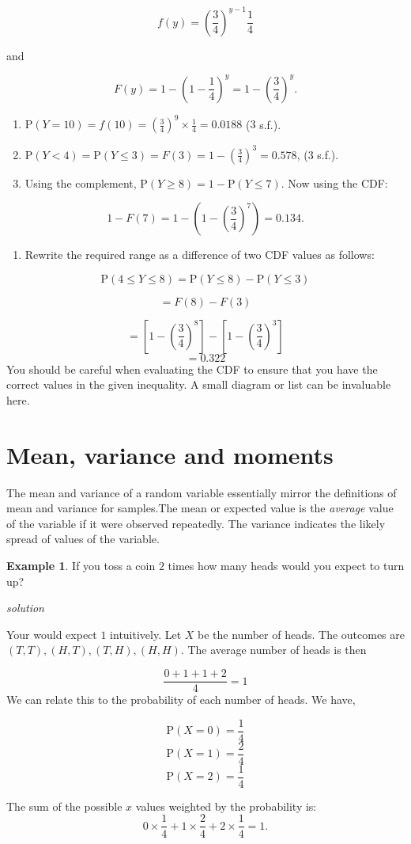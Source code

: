 \documentclass[
]{book}
\providecommand{\tightlist}{%
  \setlength{\itemsep}{0pt}\setlength{\parskip}{0pt}}
\theoremstyle{definition}
\theoremstyle{definition}
\newtheorem{example}{Example}[chapter]
\theoremstyle{definition}
\theoremstyle{definition}
\theoremstyle{remark}
\begin{document}
\[f(y) = \left( \frac{3}{4} \right) ^{y-1}\frac{1}{4}\]

and

\[ F(y) = 1- \left(1-\frac{1}{4}\right)^y = 1-\left( \frac{3}{4}\right)^y.\]

\begin{enumerate}
\def\labelenumi{\arabic{enumi}.}
\item
  \(\text{P}(Y=10) = f(10) = \left( \frac{3}{4}\right)^9\times \frac{1}{4} = 0.0188\) (\(3\) s.f.).
\item
  \(\text{P}(Y<4) = \text{P}(Y\leq 3) = F(3) =1 - \left( \frac{3}{4}\right)^3 = 0.578\), (\(3\) s.f.).
\item
  Using the complement, \(\text{P}(Y\geq 8) = 1 - \text{P}(Y\leq 7)\). Now using the CDF:
\end{enumerate}

\[1-F(7) = 1- \left( 1-\left(\frac{3}{4}\right)^7\right) = 0.134.\]

\begin{enumerate}
\def\labelenumi{\arabic{enumi}.}
\setcounter{enumi}{3}
\tightlist
\item
  Rewrite the required range as a difference of two CDF values as follows:
\end{enumerate}

\[\text{P}(4\leq Y\leq 8) = \text{P}(Y\leq 8) - \text{P}(Y\leq 3)\]

\[ = F(8) - F(3)\]

\[ = \left[ 1-\left(\frac{3}{4}\right)^8\right] -  \left[ 1-\left(\frac{3}{4}\right)^3\right]\]
\[ = 0.322\]
You should be careful when evaluating the CDF to ensure that you have the correct values in the given inequality. A small diagram or list can be invaluable here.

\hypertarget{mean-variance-and-moments}{%
\section{Mean, variance and moments}\label{mean-variance-and-moments}}

The mean and variance of a random variable essentially mirror the definitions of mean and variance for samples.The mean or expected value is the \emph{average} value of the variable if it were observed repeatedly. The variance indicates the likely spread of values of the variable.

\begin{example}
If you toss a coin \(2\) times how many heads would you expect to turn up?

\emph{solution}

Your would expect \(1\) intuitively. Let \(X\) be the number of heads.
The outcomes are \((T,T),(H,T),(T,H),(H,H)\). The average number of heads is then

\[ \frac{0+1+1+2}{4} = 1\]
We can relate this to the probability of each number of heads. We have,

\[\text{P}(X=0) = \frac{1}{4}\]
\[\text{P}(X=1) = \frac{2}{4}\]
\[\text{P}(X=2) = \frac{1}{4}\]

The sum of the possible \(x\) values weighted by the probability is:
\[0\times \frac{1}{4} + 1\times \frac{2}{4} + 2\times \frac{1}{4} = 1.\]
\end{example}
\end{document}
